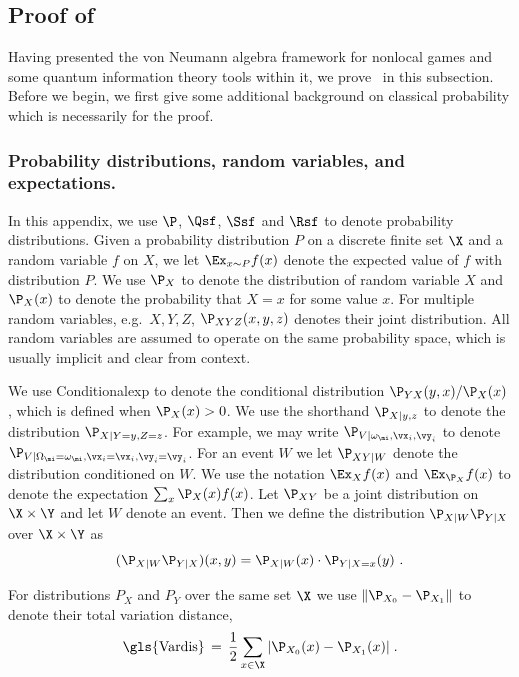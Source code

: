 

\subsection{Proof of~}

Having presented the von Neumann algebra framework for nonlocal games and some quantum information theory tools within it, we prove~ in this subsection. Before we begin, we first give some additional background on classical probability which is necessarily for the proof.  

\subsubsection{Probability distributions, random variables, and expectations.} 
In this appendix, we use $\P$, $\Qsf$, $\Ssf$ and $\Rsf$ to denote probability distributions. Given a probability distribution $P$ on a discrete finite set $\X$ and a random variable $f$ on $X$, we let $\Ex_{x \sim P} f(x)$ denote the expected value of $f$ with distribution $P$. We use $\P_X$ to denote the distribution of random variable $X$ and $\P_X(x)$ to denote the probability that $X = x$ for some value $x$. For multiple random variables, e.g.\ $X, Y, Z$, $\P_{XYZ}(x,y,z)$  denotes their joint distribution. All random variables are assumed to operate on the same probability space, which is usually implicit and clear from context. 

We use \gls{Conditionalexp} to denote the conditional distribution $\P_{YX}(y,x)/\P_X(x)$, which is defined when $\P_X(x) > 0$. We use the shorthand $\P_{X | y,z}$ to denote the distribution $\P_{X | Y =y,Z=z}$. For example, we may write $\P_{V | \omega_\mi, \vx_i, \vy_i}$ to denote $\P_{V | \Omega_\mi = \omega_\mi, \vx_i = \vx_i, \vy_i = \vy_i}$. For an event $W$ we let $\P_{X Y | W}$ denote the distribution conditioned on $W$. We use the notation $\Ex_{X} f(x)$ and $\Ex_{\P_X} f(x)$ to denote the expectation $\sum_{x} \P_X(x) f(x)$. Let $\P_{XY}$ be a joint distribution on $\X \times \Y$ and let $W$ denote an event. Then we define the distribution $\P_{X|W} \P_{Y|X}$ over $\X \times \Y$ as
\[
(\P_{X|W} \P_{Y|X})(x,y) = \P_{X|W}(x) \cdot \P_{Y | X = x}(y)~.
\]

For distributions $P_X$ and $P_Y$ over the same set $\X$ we use $\| \P_{X_0} - \P_{X_1} \|$ to denote their total variation distance,
\begin{equation} \label{eq:vardis}
	\text{\gls{Vardis}} \,=\, \frac{1}{2}\sum_{x \in \X} |\P_{X_0}(x) - \P_{X_1} (x)|\;.
\end{equation} 

